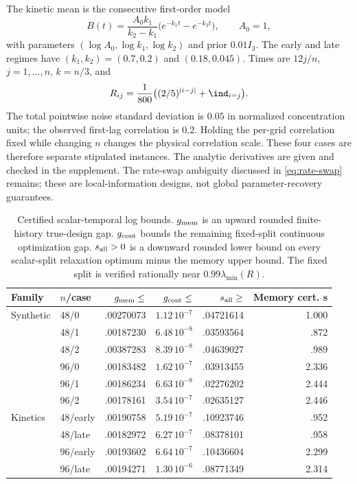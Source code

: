 The kinetic mean is the consecutive first-order model
\begin{equation}\label{eq:computational-kinetics}
 B(t)=\frac{A_0k_1}{k_2-k_1}
       \bigl(e^{-k_1t}-e^{-k_2t}\bigr),\qquad A_0=1,
\end{equation}
with parameters $(\log A_0,\log k_1,\log k_2)$ and prior $0.01I_3$.
The early and late regimes have $(k_1,k_2)=(0.7,0.2)$ and $(0.18,0.045)$.
Times are $12j/n$, $j=1,\ldots,n$, $k=n/3$, and
\begin{equation}\label{eq:temporal-probe-covariance}
 R_{ij}=\frac1{800}\bigl((2/5)^{|i-j|}+\ind_{i=j}\bigr).
\end{equation}
The total pointwise noise standard deviation is $0.05$ in normalized
concentration units; the observed first-lag correlation is $0.2$.
Holding the per-grid correlation fixed while changing $n$ changes the physical
correlation scale. These four cases are therefore separate stipulated instances.
The analytic derivatives are given and checked in the supplement. The
rate-swap ambiguity discussed in \eqref{eq:rate-swap} remains;
these are local-information designs, not global parameter-recovery guarantees.

\begin{table}[htbp]
\centering\small
\caption{Certified scalar-temporal log bounds. $g_{\rm mem}$ is an upward
rounded finite-history true-design gap. $g_{\rm cont}$ bounds the remaining
fixed-split continuous optimization gap. $s_{\rm all}>0$ is a downward rounded
lower bound on every scalar-split relaxation optimum minus the memory upper
bound. The fixed split is verified rationally near $0.99\lambda_{\min}(R)$.}
\label{tab:scalar-separations}
\begin{tabular}{llrrrr}
\toprule
Family & $n$/case & $g_{\rm mem}\le$ & $g_{\rm cont}\le$ & $s_{\rm all}\ge$ & Memory cert. s\\
\midrule
Synthetic & 48/0 & .00270073 & $1.12\,10^{-7}$ & .04721614 & 1.000\\
&48/1 & .00187230 & $6.48\,10^{-8}$ & .03593564 & .872\\
&48/2 & .00387283 & $8.39\,10^{-8}$ & .04639027 & .989\\
&96/0 & .00183482 & $1.62\,10^{-7}$ & .03913455 & 2.336\\
&96/1 & .00186234 & $6.63\,10^{-8}$ & .02276202 & 2.444\\
&96/2 & .00178161 & $3.54\,10^{-7}$ & .02635127 & 2.446\\
\midrule
Kinetics & 48/early & .00190758 & $5.19\,10^{-7}$ & .10923746 & .952\\
&48/late & .00182972 & $6.27\,10^{-7}$ & .08378101 & .958\\
&96/early & .00193602 & $6.64\,10^{-7}$ & .10436604 & 2.299\\
&96/late & .00194271 & $1.30\,10^{-6}$ & .08771349 & 2.314\\
\bottomrule
\end{tabular}
\end{table}

